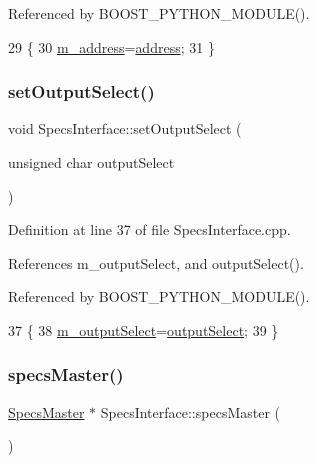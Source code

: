 Referenced by B\+O\+O\+S\+T\+\_\+\+P\+Y\+T\+H\+O\+N\+\_\+\+M\+O\+D\+U\+L\+E().


\begin{DoxyCode}
29                                                     \{
30     \hyperlink{classSpecsInterface_a4064da5ca6e0a172363967c4acc0b365}{m\_address}=\hyperlink{classSpecsInterface_a0fa039a15b842a5ba783ce825b9915d8}{address};
31 \}
\end{DoxyCode}
\mbox{\label{classSpecsInterface_a1907d360f2bda367cfb1d39e379c6493}} 
\subsubsection{\texorpdfstring{set\+Output\+Select()}{setOutputSelect()}}
{\footnotesize\ttfamily void Specs\+Interface\+::set\+Output\+Select (\begin{DoxyParamCaption}\item[{unsigned char}]{output\+Select }\end{DoxyParamCaption})}



Definition at line 37 of file Specs\+Interface.\+cpp.



References m\+\_\+output\+Select, and output\+Select().



Referenced by B\+O\+O\+S\+T\+\_\+\+P\+Y\+T\+H\+O\+N\+\_\+\+M\+O\+D\+U\+L\+E().


\begin{DoxyCode}
37                                                               \{
38     \hyperlink{classSpecsInterface_a660cb4112ce1c071f277cb6ec115b411}{m\_outputSelect}=\hyperlink{classSpecsInterface_ab291ed03f4c2f0143e14c26ad5f648dd}{outputSelect};
39 \}
\end{DoxyCode}
\mbox{\label{classSpecsInterface_a3d497c965fb6ec06b49a54b7901a22b2}} 
\subsubsection{\texorpdfstring{specs\+Master()}{specsMaster()}}
{\footnotesize\ttfamily \hyperlink{classSpecsMaster}{Specs\+Master} $\ast$ Specs\+Interface\+::specs\+Master (\begin{DoxyParamCaption}{ }\end{DoxyParamCaption})\hspace{0.3cm}{\ttfamily [virtual]}}

